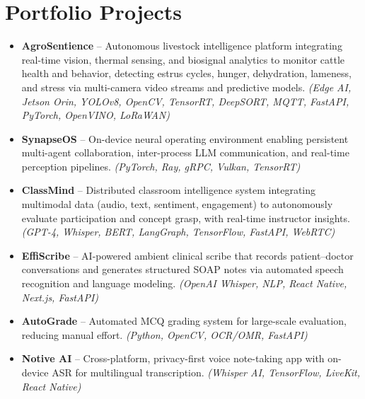 \documentclass[11pt,a4paper]{article}
\begin{document}
\section*{Portfolio Projects}
\begin{itemize}
    \item \textbf{AgroSentience} -- Autonomous livestock intelligence platform integrating real-time
          vision, thermal sensing, and biosignal analytics to monitor cattle health and behavior,
          detecting estrus cycles, hunger, dehydration, lameness, and stress via multi-camera video
          streams and predictive models. \textit{(Edge AI, Jetson Orin, YOLOv8, OpenCV, TensorRT,
          DeepSORT, MQTT, FastAPI, PyTorch, OpenVINO, LoRaWAN)}
    \item \textbf{SynapseOS} -- On-device neural operating environment enabling persistent multi-agent
          collaboration, inter-process LLM communication, and real-time perception pipelines.
          \textit{(PyTorch, Ray, gRPC, Vulkan, TensorRT)}
    \item \textbf{ClassMind} -- Distributed classroom intelligence system integrating multimodal data
          (audio, text, sentiment, engagement) to autonomously evaluate participation and concept
          grasp, with real-time instructor insights. \textit{(GPT-4, Whisper, BERT, LangGraph,
          TensorFlow, FastAPI, WebRTC)}
    \item \textbf{EffiScribe} -- AI-powered ambient clinical scribe that records patient--doctor
          conversations and generates structured SOAP notes via automated speech recognition and
          language modeling. \textit{(OpenAI Whisper, NLP, React Native, Next.js, FastAPI)}
    \item \textbf{AutoGrade} -- Automated MCQ grading system for large-scale evaluation, reducing
          manual effort. \textit{(Python, OpenCV, OCR/OMR, FastAPI)}
    \item \textbf{Notive AI} -- Cross-platform, privacy-first voice note-taking app with on-device ASR
          for multilingual transcription. \textit{(Whisper AI, TensorFlow, LiveKit, React Native)}
\end{itemize}

\end{document}
